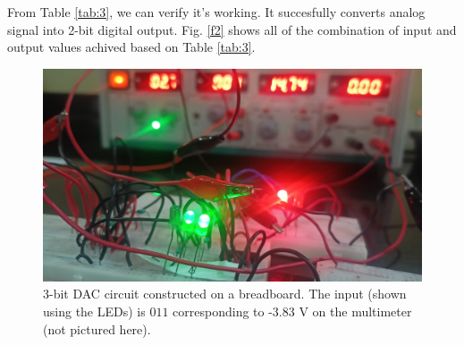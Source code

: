 From Table \ref{tab:3}, we can verify it's working. It succesfully converts analog signal into 2-bit digital output. Fig. \ref{f2} shows all of the combination of input and output values achived based on Table \ref{tab:3}.





\begin{figure}[H]
    \centering
    \includegraphics[width=1\columnwidth]{images/dac.jpg}
    \caption{3-bit DAC circuit constructed on a breadboard. The input (shown using the LEDs) is $011$ corresponding to -3.83 V on the multimeter (not pictured here).}
    \label{f1}
\end{figure}

